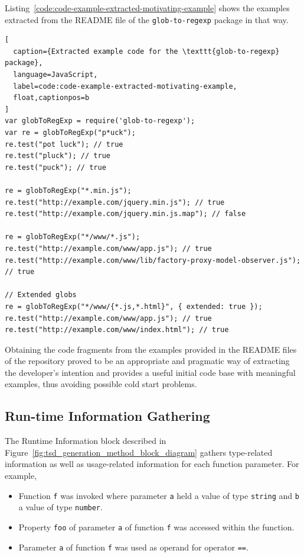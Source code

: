 \documentclass[english,cleveref,autoref,submission]{programming}
\newcommand{\figref}[1]{Figure~\ref{#1}}
\newcommand{\coderef}[1]{Listing~\ref{#1}}
\begin{document}
\coderef{code:code-example-extracted-motivating-example} shows
the examples extracted from  the README file of the \texttt{glob-to-regexp} package in
that way.

\begin{lstlisting}[
  caption={Extracted example code for the \texttt{glob-to-regexp} package},
  language=JavaScript,
  label=code:code-example-extracted-motivating-example,
  float,captionpos=b
]
var globToRegExp = require('glob-to-regexp');
var re = globToRegExp("p*uck");
re.test("pot luck"); // true
re.test("pluck"); // true
re.test("puck"); // true

re = globToRegExp("*.min.js");
re.test("http://example.com/jquery.min.js"); // true
re.test("http://example.com/jquery.min.js.map"); // false

re = globToRegExp("*/www/*.js");
re.test("http://example.com/www/app.js"); // true
re.test("http://example.com/www/lib/factory-proxy-model-observer.js"); // true

// Extended globs
re = globToRegExp("*/www/{*.js,*.html}", { extended: true });
re.test("http://example.com/www/app.js"); // true
re.test("http://example.com/www/index.html"); // true
\end{lstlisting}

Obtaining the code fragments from the examples provided in the
README files of the repository proved to be an
appropriate and pragmatic way of extracting the developer's
intention and provides a useful initial code base with meaningful
examples, thus avoiding possible cold start problems.

\subsection{Run-time Information Gathering}
\label{sec:run-time-information}
The Runtime Information block described in
\figref{fig:tsd_generation_method_block_diagram} gathers
type-related information as well as usage-related information for each function parameter.
For example,

\begin{itemize}
  \item Function \lstinline{f} was invoked where parameter
    \lstinline{a} held a value of type \lstinline{string} and
    \lstinline{b} a value of type \lstinline{number}. 
  \item Property \lstinline{foo} of parameter \lstinline{a} of
    function \lstinline{f} was accessed within the function. 
  \item Parameter \lstinline{a} of function \lstinline{f} was used as
    operand for operator \lstinline{==}. 
\end{itemize}
\end{document}
